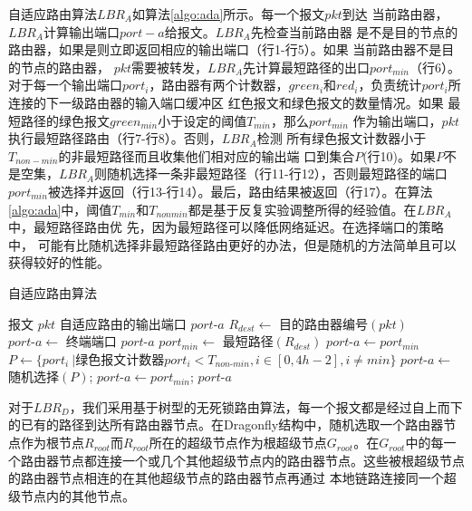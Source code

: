 自适应路由算法$LBR_A$如算法\ref{algo:ada}所示。每一个报文$pkt$到达
当前路由器，$LBR_A$计算输出端口$port-a$给报文。$LBR_A$先检查当前路由器
是不是目的节点的路由器，如果是则立即返回相应的输出端口（行1-行5）。如果
当前路由器不是目的节点的路由器，
$pkt$需要被转发，$LBR_A$先计算最短路径的出口$port_{min}$（行6）。对于每一个输出端口$port_i$，路由器有两个计数器，$green_i$和$red_i$，负责统计$port_i$所连接的下一级路由器的输入端口缓冲区
红色报文和绿色报文的数量情况。如果
最短路径的绿色报文$green_{min}$小于设定的阈值$T_{min}$，那么$port_{min}$
作为输出端口，$pkt$执行最短路径路由（行7-行8）。否则，$LBR_A$检测
所有绿色报文计数器小于$T_{non-min}$的非最短路径而且收集他们相对应的输出端
口到集合$P$(行10)。如果$P$不是空集，$LBR_A$则随机选择一条非最短路径（行11-行12），否则最短路径的端口$port_{min}$被选择并返回（行13-行14）。最后，路由结果被返回（行17）。在算法\ref{algo:ada}中，阈值$T_{min}$和$T_{nonmin}$都是基于反复实验调整所得的经验值。在$LBR_A$中，最短路径路由优
先，因为最短路径可以降低网络延迟。在选择端口的策略中，
可能有比随机选择非最短路径路由更好的办法，但是随机的方法简单且可以获得较好的性能。


\begin{algorithm}[t]
  \centering
  \caption{自适应路由算法}
  \label{algo:ada}
  \begin{algorithmic}[1]
    \REQUIRE 报文 $pkt$
    \ENSURE 自适应路由的输出端口 $port\textrm{-}a$
    \STATE $R_{dest} \leftarrow$ 目的路由器编号$(pkt)$
    \STATE $port\textrm{-}a \leftarrow$ 终端端口
    \RETURN $port\textrm{-}a$
    \ENDIF
    \STATE $port_{min} \leftarrow$ 最短路径$(R_{dest})$
    \STATE $port\textrm{-}a \leftarrow port_{min}$
    \ELSE
    \STATE $P \leftarrow \{port_i\ |$绿色报文计数器${port_i} < T_{non\textrm{-}min}, i \in [0,4h-2], i \neq min\}$\hspace{-1em}
    \STATE $port\textrm{-}a \leftarrow$ 随机选择$(P)$;
    \ELSE
    \STATE $port\textrm{-}a \leftarrow port_{min}$;
    \ENDIF
    \ENDIF
    \RETURN $port\textrm{-}a$
  \end{algorithmic}
\end{algorithm}

对于$LBR_D$，我们采用基于树型的无死锁路由算法，每一个报文都是经过自上而下的已有的路径到达所有路由器节点。在Dragonfly结构中，随机选取一个路由器节点作为根节点$R_{root}$而$R_{root}$所在的超级节点作为根超级节点$G_{root}$。在$G_{root}$中的每一个路由器节点都连接一个或几个其他超级节点内的路由器节点。这些被根超级节点的路由器节点相连的在其他超级节点的路由器节点再通过
本地链路连接同一个超级节点内的其他节点。

